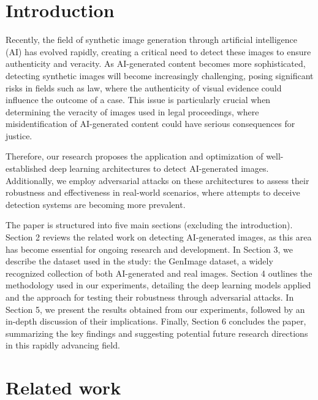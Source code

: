 \documentclass[runningheads]{llncs}
\begin{document}
\section{Introduction}

Recently, the field of synthetic image generation through artificial intelligence (AI) has evolved rapidly, creating a critical need to detect these images to ensure authenticity and veracity. As AI-generated content becomes more sophisticated, detecting synthetic images will become increasingly challenging, posing significant risks in fields such as law, where the authenticity of visual evidence could influence the outcome of a case. This issue is particularly crucial when determining the veracity of images used in legal proceedings, where misidentification of AI-generated content could have serious consequences for justice.

Therefore, our research proposes the application and optimization of well-established deep learning architectures to detect AI-generated images. Additionally, we employ adversarial attacks on these architectures to assess their robustness and effectiveness in real-world scenarios, where attempts to deceive detection systems are becoming more prevalent.

The paper is structured into five main sections (excluding the introduction). Section 2 reviews the related work on detecting AI-generated images, as this area has become essential for ongoing research and development. In Section 3, we describe the dataset used in the study: the GenImage dataset, a widely recognized collection of both AI-generated and real images. Section 4 outlines the methodology used in our experiments, detailing the deep learning models applied and the approach for testing their robustness through adversarial attacks. In Section 5, we present the results obtained from our experiments, followed by an in-depth discussion of their implications. Finally, Section 6 concludes the paper, summarizing the key findings and suggesting potential future research directions in this rapidly advancing field.

%
%
\section{Related work}
\end{document}
